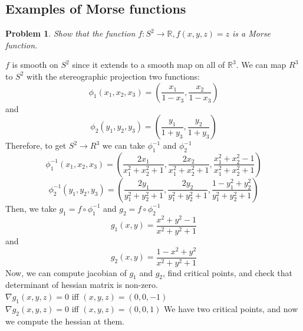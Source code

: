 \documentclass[]{article}
\newtheorem{problem}{Problem}
\newcommand{\R}{\mathbb{R}}
\begin{document}
\subsection{Examples of Morse functions} 
\begin{problem}
Show that the function $f: S^2 \to \R, f(x,y,z) = z$ is a Morse function.
\end{problem}
$f$ is smooth on $ S^2 $ since it extends to a smooth map on all of $\R^3$. We can map $R^3$ to $S^2$ with the stereographic projection two functions:
\begin{equation}
	\phi_1(x_1,x_2,x_3) = (\frac{x_1}{1-x_3}, \frac{x_2}{1-x_3} ) 
\end{equation}
and
\begin{equation}
	\phi_2(y_1,y_2,y_3) = (\frac{y_1}{1+y_3},\frac{y_2}{1+y_3})
\end{equation}
Therefore, to get $S^2 \to R^3$ we can take $\phi_1^{-1}$ and $\phi_2^{-1}$ \\
\begin{equation}
\phi_1^{-1}(x_1,x_2,x_3) = (\frac{2x_1}{x_1^2+x_2^2+1}, \frac{2x_2}{x_1^2+x_2^2+1}, \frac{x_1^2+x_2^2-1}{x_1^2+x_2^2+1})
\end{equation}
\begin{equation}
	\phi_2^{-1}(y_1,y_2,y_3) = (\frac{2y_1}{y_1^2+y_2^2+1}, \frac{2y_2}{y_1^2+y_2^2+1}, \frac{1-y_1^2+y_2^2}{y_1^2+y_2^2+1})
\end{equation}
Then, we take $g_1 = f \circ \phi_1^{-1}$ and $g_2 = f \circ \phi_2^{-1}$ \\
\begin{equation}
	g_1(x,y) =  \frac{x^2+y^2-1}{x^2+y^2+1}
\end{equation}
and
\begin{equation}
	g_2(x,y) = \frac{1-x^2+y^2}{x^2+y^2+1}
\end{equation}
Now, we can compute jacobian of $g_1$ and $g_2$, find critical points, and check that determinant of hessian matrix is non-zero. \\
$
	\nabla g_1(x,y,z) = 0$ iff $(x,y,z) = (0,0,-1)
$\\
$
	\nabla g_2(x,y,z) = 0$ iff $ (x,y,z) = (0,0,1)
$
We have two critical points, and now we compute the hessian at them.\\
\end{document}
